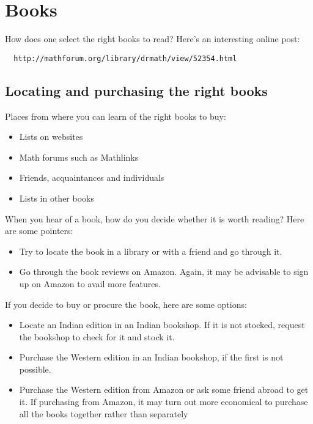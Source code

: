 \documentclass[a4paper]{amsart}
\begin{document}
\section{Books}

How does one select the right books to read? Here's an interesting online post:

\begin{verbatim}
  http://mathforum.org/library/drmath/view/52354.html
\end{verbatim}

\subsection{Locating and purchasing the right books}

Places from where you can learn of the right books to buy:

\begin{itemize}

\item Lists on websites

\item Math forums such as Mathlinks

\item Friends, acquaintances and individuals

\item Lists in other books

\end{itemize}

When you hear of a  book, how do you decide whether it is worth reading? Here are some pointers:

\begin{itemize}

\item Try to locate the book in a library or with a friend and go through it.

\item Go through the book reviews on Amazon. Again, it may be advisable to sign up on Amazon to avail more features.

\end{itemize}

If you decide to buy or procure the book, here are some options:

\begin{itemize}

\item Locate an Indian edition in an Indian bookshop. If it is not stocked, request the bookshop to check for it and stock it.

\item Purchase the Western edition in an Indian bookshop, if the first is not possible.

\item Purchase the Western edition from Amazon or ask some friend abroad to get it. If purchasing from Amazon, it may turn out more
  economical to purchase all the books together rather than separately

\end{itemize}
\end{document}
